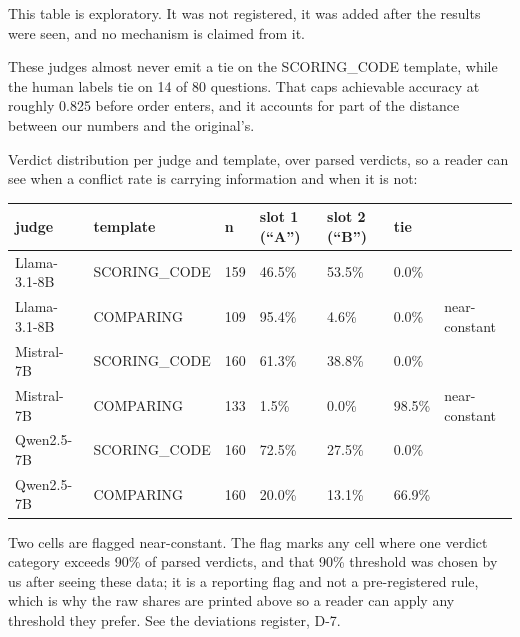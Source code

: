 This table is exploratory. It was not registered, it was added after the results were seen, and no
mechanism is claimed from it.

These judges almost never emit a tie on the SCORING\_CODE template, while the human labels tie on 14 of
80 questions. That caps achievable accuracy at roughly 0.825 before order enters, and it accounts
for part of the distance between our numbers and the original's.

Verdict distribution per judge and template, over parsed verdicts, so a reader can see when a
conflict rate is carrying information and when it is not:

{\def\LTcaptype{none} %
\begin{longtable}[]{@{}lllllll@{}}
\toprule\noalign{}
judge & template & n & slot 1 (``A'') & slot 2 (``B'') & tie & \\
\midrule\noalign{}
\endhead
\bottomrule\noalign{}
\endlastfoot
Llama-3.1-8B & SCORING\_CODE & 159 & 46.5\% & 53.5\% & 0.0\% & \\
Llama-3.1-8B & COMPARING & 109 & 95.4\% & 4.6\% & 0.0\% & near-constant \\
Mistral-7B & SCORING\_CODE & 160 & 61.3\% & 38.8\% & 0.0\% & \\
Mistral-7B & COMPARING & 133 & 1.5\% & 0.0\% & 98.5\% & near-constant \\
Qwen2.5-7B & SCORING\_CODE & 160 & 72.5\% & 27.5\% & 0.0\% & \\
Qwen2.5-7B & COMPARING & 160 & 20.0\% & 13.1\% & 66.9\% & \\
\end{longtable}
}

Two cells are flagged near-constant. The flag marks any cell where one verdict category exceeds 90\%
of parsed verdicts, and that 90\% threshold was chosen by us after seeing these data; it is a
reporting flag and not a pre-registered rule, which is why the raw shares are printed above so a
reader can apply any threshold they prefer. See the deviations register, D-7.

